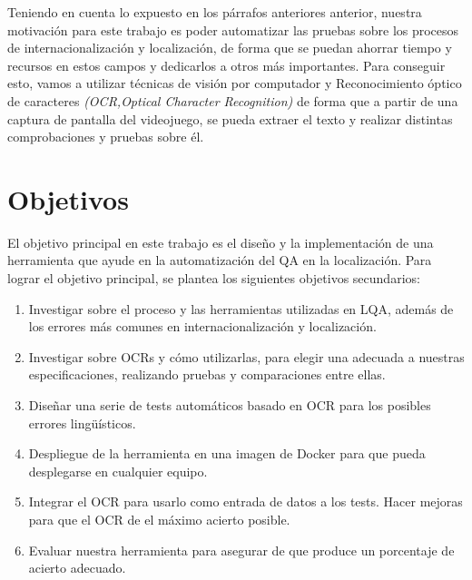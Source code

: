Teniendo en cuenta lo expuesto en los párrafos anteriores anterior, nuestra motivación para este trabajo es poder automatizar las pruebas sobre los procesos de internacionalización y localización, de forma que se puedan
ahorrar tiempo y recursos en estos campos y dedicarlos a otros más importantes. Para conseguir esto, vamos a utilizar técnicas de visión por computador y Reconocimiento óptico de caracteres \textit{(OCR,Optical Character Recognition)}
de forma que a partir de una captura de pantalla del videojuego, se pueda extraer el texto y realizar distintas comprobaciones y pruebas sobre él.


\section{Objetivos}
El objetivo principal en este trabajo es el diseño y la implementación de una herramienta que ayude en la automatización del QA en la localización.
Para lograr el objetivo principal, se plantea los siguientes objetivos secundarios: 
\begin{enumerate}

	\item Investigar sobre el proceso y las herramientas utilizadas en LQA, además de los errores más comunes en internacionalización y localización.
	\item Investigar sobre OCRs y cómo utilizarlas, para elegir una adecuada a nuestras especificaciones, realizando pruebas y comparaciones entre ellas.
	\item Diseñar una serie de tests automáticos basado en OCR para los posibles errores lingüísticos.
	\item Despliegue de la herramienta en una imagen de Docker para que pueda desplegarse en cualquier equipo.
	\item Integrar el OCR para usarlo como entrada de datos a los tests. Hacer mejoras para que el OCR de el máximo acierto posible.
	\item Evaluar nuestra herramienta para asegurar de que produce un porcentaje de acierto adecuado.
\end{enumerate}
